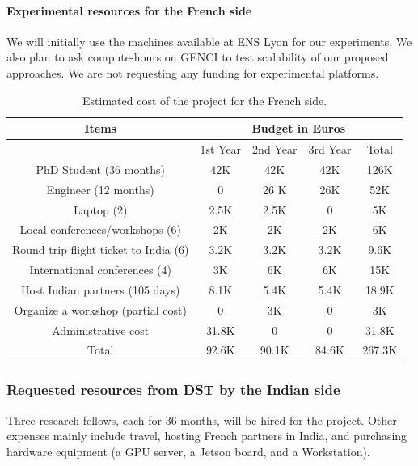 \documentclass[a4paper,11pt]{article}
\begin{document}
\paragraph{Experimental resources for the French side} We will initially use the machines available at ENS Lyon for our experiments. We also plan to ask compute-hours on GENCI to test scalability of our proposed approaches. We are not requesting any funding for experimental platforms.
	\begin{table}
		\begin{center}
  			 \begin{tabular}{|c|c|c|c|c|}
				\hline 
				 Items & \multicolumn{4}{c|}{Budget in Euros}\\ 
				\hline 
				  & 1st Year & 2nd Year & 3rd Year & Total\\ 
				\hline 
				 PhD Student (36 months) & 42K & 42K & 42K & 126K \\ \hline
				 Engineer (12 months) & 0 & 26 K & 26K & 52K \\ \hline
				 Laptop (2) & 2.5K & 2.5K & 0 & 5K  \\ \hline
				 Local conferences/workshops (6) & 2K & 2K & 2K & 6K \\ \hline
				 Round trip flight ticket to India (6) & 3.2K & 3.2K & 3.2K & 9.6K \\ \hline
				 International conferences (4) & 3K & 6K & 6K & 15K \\ \hline
				 Host Indian partners (105 days) & 8.1K & 5.4K & 5.4K & 18.9K \\ \hline
				 Organize a workshop (partial cost) & 0 & 3K & 0 & 3K \\ \hline
				 Administrative cost & 31.8K & 0 & 0 & 31.8K \\ \hline
				Total & 92.6K  & 90.1K  & 84.6K & 267.3K \\ \hline
			\end{tabular}
		\caption{Estimated cost of the project for the French side.	\label{tab:costs:French}}
		\end{center}
	\end{table}


\subsubsection{Requested resources from DST by the Indian side}

Three research fellows, each for 36 months, will be hired for the project. Other expenses mainly include travel, hosting French partners in India, and purchasing hardware equipment (a GPU server, a Jetson board, and a Workstation).
\end{document}
